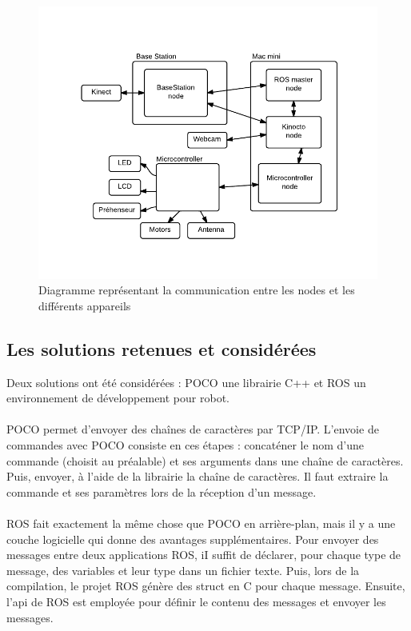 \begin{figure}[htbp]
\centering
\includegraphics[scale=1]{fig/communicationNodesAppareils.pdf}
\caption{Diagramme représentant la communication entre les nodes et les différents appareils}
\label{fig:commNodes}
\end{figure}

\subsection{Les solutions retenues et considérées}
Deux solutions ont été considérées : POCO une librairie C++ et ROS un environnement de développement pour robot.

\paragraph{}POCO permet d’envoyer des chaînes de caractères par TCP/IP. L’envoie de commandes avec POCO consiste en ces étapes : concaténer le nom d’une commande (choisit au préalable) et ses arguments dans une chaîne de caractères. Puis, envoyer, à l’aide de la librairie la chaîne de caractères. Il faut extraire la commande et ses paramètres lors de la réception d’un message.

\paragraph{}ROS fait exactement la même chose que POCO en arrière-plan, mais il y a une couche logicielle qui donne des avantages supplémentaires. Pour envoyer des messages entre deux applications ROS, iI suffit de déclarer, pour chaque type de message, des variables et leur type dans un fichier texte. Puis, lors de la compilation, le projet ROS génère des struct en C pour chaque message. Ensuite, l’api de ROS est employée pour définir le contenu des messages et envoyer les messages.

